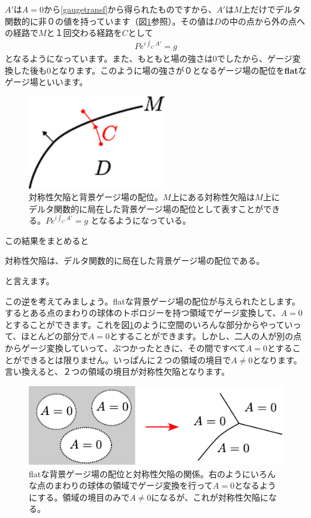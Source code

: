 \documentclass[report,paper=a4, fontsize=12pt, line_length=16cm, number_of_lines=33,dvipdfmx]{jlreq}
\newcommand{\kyou}[1]{{\sffamily \bfseries #1}}
\numberwithin{equation}{chapter}
\begin{document}
$A'$は$A=0$から\eqref{gaugetransf}から得られたものですから、$A'$は$M$上だけでデルタ関数的に非０の値を持っています（図\ref{fig:localizedgaugefield}参照）。その値は$D$の中の点から外の点への経路で$M$と１回交わる経路を$C$として
\begin{align}
  P e^{i\int_{C}A'} = g
\end{align}
となるようになっています。また、もともと場の強さは$0$でしたから、ゲージ変換した後も$0$となります。このように場の強さが０となるゲージ場の配位を\kyou{flat}なゲージ場といいます。

\begin{figure}
  \centering
  \includegraphics[width=6cm]{localizedgaugefield.pdf}
  \caption{対称性欠陥と背景ゲージ場の配位。$M$上にある対称性欠陥は$M$上にデルタ関数的に局在した背景ゲージ場の配位として表すことができる。$P e^{i\int_{C}A'} = g$ となるようになっている。}
  \label{fig:localizedgaugefield}
\end{figure}

この結果をまとめると
\begin{emphasize}
  対称性欠陥は、デルタ関数的に局在した背景ゲージ場の配位である。
\end{emphasize}
と言えます。

この逆を考えてみましょう。flatな背景ゲージ場の配位が与えられたとします。するとある点のまわりの球体のトポロジーを持つ領域でゲージ変換して、$A=0$とすることができます。これを図\ref{fig:localizedgaugefield}のように空間のいろんな部分からやっていって、ほとんどの部分で$A=0$とすることができます。しかし、二人の人が別の点からゲージ変換していって、ぶつかったときに、その間ですべて$A=0$とすることができるとは限りません。いっぱんに２つの領域の境目で$A\ne 0$となります。言い換えると、２つの領域の境目が対称性欠陥となります。

\begin{figure}
  \centering
  \includegraphics{flatgaugefield.pdf}
  \caption{flatな背景ゲージ場の配位と対称性欠陥の関係。右のようにいろんな点のまわりの球体の領域でゲージ変換を行って$A=0$となるようにする。領域の境目のみで$A\ne 0$になるが、これが対称性欠陥になる。}
  \label{fig:flatgaugefield}
\end{figure}
\end{document}
